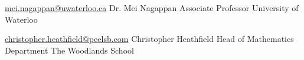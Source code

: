 

\begin{cventries}

  \cventry
    {\href{mailto:mei.nagappan@uwaterloo.ca}{mei.nagappan@uwaterloo.ca}} %
    {Dr. Mei Nagappan} %
    {Associate Professor} %
    {University of Waterloo} %

  \cventry
    {\href{mailto:christopher.heathfield@peelsb.com}{christopher.heathfield@peelsb.com}} %
    {Christopher Heathfield} %
    {Head of Mathematics Department} %
    {The Woodlands School} %


\end{cventries}
